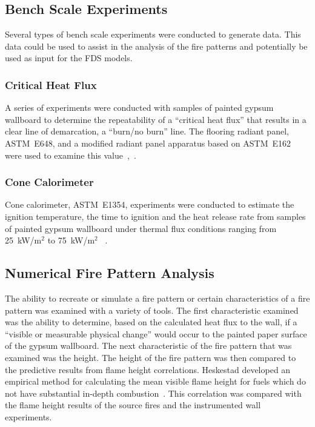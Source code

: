 \documentclass[twoside]{uocthesis}
\begin{document}
{\subsection{Bench Scale Experiments}

Several types of bench scale experiments were conducted to generate data. This data could be used to assist in the analysis of the fire patterns and potentially be used as input for the FDS models.

\subsubsection{Critical Heat Flux}

A series of experiments were conducted with samples of painted gypsum wallboard to determine the repeatability of a ``critical heat flux'' that results in a clear line of demarcation, a ``burn/no burn'' line.  The flooring radiant panel, ASTM~E648, and a modified radiant panel apparatus based on ASTM~E162 were used to examine this value~\cite{ASTM_E648},~\cite{ASTM_E162}.

\subsubsection{Cone Calorimeter}

Cone calorimeter, ASTM~E1354, experiments were conducted to estimate the ignition temperature, the time to ignition and the heat release rate from samples of painted gypsum wallboard under thermal flux conditions ranging from 25~kW/m$^2$ to 75~kW/m$^2$ ~\cite{ASTM_E1354}.

\subsection{Numerical Fire Pattern Analysis}

The ability to recreate or simulate a fire pattern or certain characteristics of a fire pattern was examined with a variety of tools.  The first characteristic examined was the ability to determine, based on the calculated heat flux to the wall, if a ``visible or measurable physical change'' would occur to the painted paper surface of the gypsum wallboard.  The next characteristic of the fire pattern that was examined was the height.  The height of the fire pattern was then compared to the predictive results from flame height correlations. Heskestad developed an empirical method for calculating the mean visible flame height for fuels which do not have substantial in-depth combustion~\cite{Beyler:1986,Heskestad:SFPE}. This correlation was compared with the flame height results of the source fires and the instrumented wall experiments.

}
\end{document}
